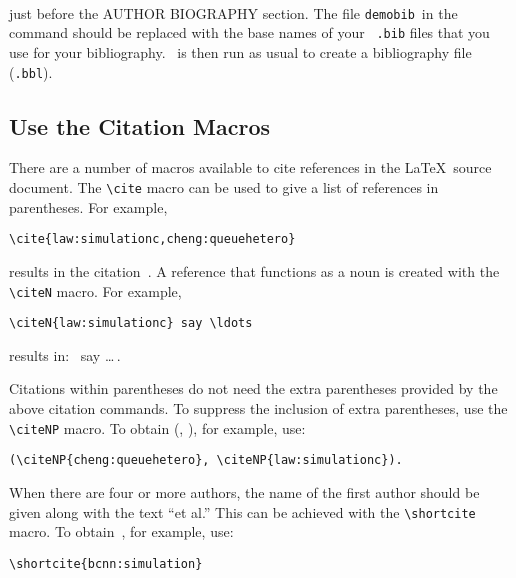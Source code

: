 \documentclass{scspaperproc}
\theoremstyle{scsthe}
\begin{document}
\begin{verbatim}


\end{verbatim}

just before the AUTHOR BIOGRAPHY section.  The file \texttt{demobib}\ in the \verb++ command should be replaced with the base names of your \BibTeX\ \texttt{.bib} files that you use for your bibliography.  \BibTeX\ is then run as usual to create a bibliography file (\texttt{.bbl}).


\subsection{Use the Citation Macros}
There are a number of macros available to cite references in the \LaTeX\ source document.  The \verb+\cite+ macro can be used to give a list of references in parentheses.  For example,

\begin{verbatim}
\cite{law:simulationc,cheng:queuehetero}
\end{verbatim} %

results in the citation~\cite{law:simulationc,cheng:queuehetero}. A reference that functions as a noun is created with the \verb+\citeN+ macro. For example,

\begin{verbatim}
\citeN{law:simulationc} say \ldots
\end{verbatim}

results in:~ say \ldots\,.

Citations within parentheses do not need the extra parentheses provided by the above citation commands. To suppress the inclusion of extra parentheses, use the \verb+\citeNP+ macro. To obtain (, ), for example, use:

\begin{verbatim}
(\citeNP{cheng:queuehetero}, \citeNP{law:simulationc}).
\end{verbatim}

When there are four or more authors, the name of the first author should be given along with the text ``et al.''  This can be achieved with the \verb+\shortcite+ macro. To obtain~, for example, use: 

\begin{verbatim}
\shortcite{bcnn:simulation}
\end{verbatim}
\end{document}
